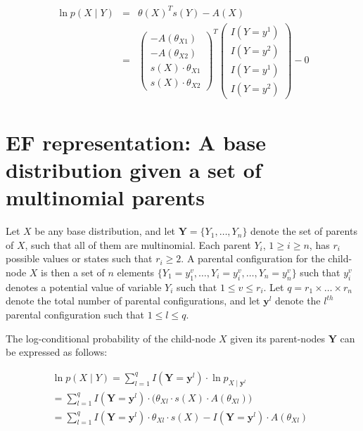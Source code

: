 \documentclass[11pt, oneside]{article}   	%
\numberwithin{figure}{section}
\numberwithin{equation}{section}
\numberwithin{table}{section}
\theoremstyle{definition}
\begin{document}
\begin{appendices}
\begin{itemize}
\begin{eqnarray*}
\ln p(X \mid Y) &=& \theta(X)^T s(Y) - A(X) \\
&=&
\begin{pmatrix}
- A(\theta_{X1}) \\
- A(\theta_{X2})\\
s(X) \cdot \theta_{X1}\\
s(X) \cdot \theta_{X2}
\end{pmatrix}^T
\begin{pmatrix}
I(Y=y^1) \\
I(Y=y^2) \\
I(Y=y^1) \\
I(Y=y^2)
\end{pmatrix}
- 0
\end{eqnarray*}

\end{itemize}

\newpage
\section{EF representation: A base distribution given a set of multinomial parents}

Let $X$ be any base distribution, and let $\mathbf{Y} =\{Y_1,\ldots,Y_n\}$ denote the set of parents of $X$, such that all of them are multinomial. Each parent $Y_i$, $1 \geq i \geq n$, has $r_i$ possible values or states such that $r_i \geq 2$. A parental configuration for the child-node $X$ is then a set of $n$ elements $\{Y_1 = y_1^{v}, \ldots, Y_i = y_i^{v},\ldots, Y_n = y_n^{v} \}$ such that $y_i^{v}$ denotes a potential value of variable $Y_i$ such that  $1 \leq v \leq r_i$. Let $q = r_1 \times \ldots \times r_n$ denote the total number of parental configurations, and let $\mathbf{y}^l$ denote the $l^{th}$ parental configuration such that $1 \leq l \leq q$.

The log-conditional probability of the child-node $X$ given its parent-nodes $\mathbf{Y}$ can be expressed as follows:

\begin{eqnarray*}
\ln p(X \mid Y) =  \sum_{l=1}^q I(\mathbf{Y} =\mathbf{y}^l) \cdot \ln p_{X \mid \mathbf{y}^l} ~~~~~~~~~~~~~~~~~~~~~~~~~~~~~~~\\
= \sum_{l=1}^q I(\mathbf{Y} =\mathbf{y}^l) \cdot \Big(  \theta_{Xl}   \cdot  s(X)  \cdot  A(\theta_{Xl}) \Big)~~~~~~~~~~~~~\\
= \sum_{l=1}^q I(\mathbf{Y} =\mathbf{y}^l) \cdot \theta_{Xl} \cdot s(X) - I(\mathbf{Y} =\mathbf{y}^l) \cdot A(\theta_{Xl})
\end{eqnarray*}


\end{appendices}
\end{document}
